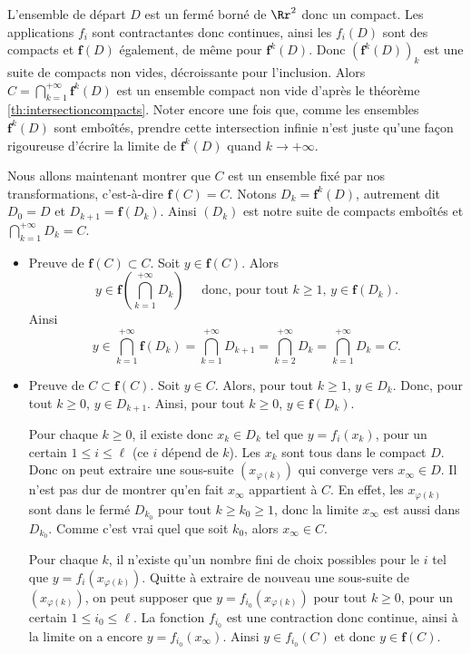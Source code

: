 \documentclass[11pt,class=report,crop=false]{standalone}
\begin{document}
\medskip

L'ensemble de départ $D$ est un fermé borné de $\Rr^2$ donc un compact.
Les applications $f_i$ sont contractantes donc continues, ainsi
les $f_i(D)$ sont des compacts et $\mathbf{f}(D)$ également, de même pour $\mathbf{f}^k(D)$.
Donc  $\left(\mathbf{f}^k(D)\right)_k$ est une suite de compacts non vides,
décroissante pour l'inclusion. Alors $C = \bigcap_{k=1}^{+\infty} \mathbf{f}^k(D)$
est un ensemble compact non vide d'après le théorème \ref{th:intersectioncompacts}. 
Noter encore une fois que, comme les ensembles $\mathbf{f}^k(D)$ sont emboîtés, 
prendre cette intersection infinie n'est juste qu'une façon rigoureuse d'écrire
la limite de $\mathbf{f}^k(D)$ quand $k\to +\infty$. 

Nous allons maintenant montrer que $C$ est un ensemble fixé par nos transformations, c'est-à-dire
$\mathbf{f}(C)=C$.
Notons $D_k = \mathbf{f}^k(D)$, autrement dit $D_0 = D$ et $D_{k+1} = \mathbf{f}(D_k)$. Ainsi
$(D_k)$ est notre suite de compacts emboîtés et $\bigcap_{k=1}^{+\infty} D_k = C$.


\begin{itemize}
  \item Preuve de $\mathbf{f}(C) \subset C$.  
  Soit $y \in \mathbf{f}(C)$. Alors 
  $$y \in \mathbf{f}\left(\bigcap_{k=1}^{+\infty} D_k\right)
  \quad \text{ donc, pour tout $k\ge 1$, } y \in \mathbf{f}(D_k).$$
   Ainsi
  $$y \in \bigcap_{k=1}^{+\infty}\mathbf{f}(D_k) 
  = \bigcap_{k=1}^{+\infty} D_{k+1} = \bigcap_{k=2}^{+\infty} D_{k}
  = \bigcap_{k=1}^{+\infty} D_{k} = C.$$
  
  \item Preuve de $C \subset \mathbf{f}(C)$.
  Soit $y \in C$. Alors, pour tout $k\ge1$, $y \in D_k$.
  Donc, pour tout $k\ge0$, $y \in D_{k+1}$. Ainsi, 
  pour tout $k\ge0$, $y \in \mathbf{f}({D_k})$.
  
  Pour chaque $k\ge0$, il existe donc $x_k \in D_k$ tel que 
  $y = f_i(x_k)$, pour un certain $1 \le i \le \ell$ (ce $i$ dépend de $k$).
  Les $x_k$ sont tous dans le compact $D$. Donc on peut extraire une sous-suite $(x_{\varphi(k)})$ 
  qui converge vers $x_\infty \in D$. 
  Il n'est pas dur de montrer qu'en fait $x_\infty$ appartient à $C$. En effet,
  les $x_{\varphi(k)}$ sont dans le fermé $D_{k_0}$ pour tout $k\ge k_0 \ge 1$, donc la limite 
  $x_\infty$ est aussi dans $D_{k_0}$. Comme c'est vrai quel que soit $k_0$, alors $x_\infty \in C$.
  
  Pour chaque $k$, il n'existe qu'un nombre fini de choix possibles pour le $i$
  tel que $y = f_i(x_{\varphi(k)})$. Quitte à extraire de nouveau une sous-suite de $(x_{\varphi(k)})$,
  on peut supposer que $y = f_{i_0}(x_{\varphi(k)})$
  pour tout $k\ge0$, pour un certain $1 \le i_0 \le \ell$. La fonction $f_{i_0}$ est une contraction donc continue, ainsi à la limite on a encore
  $y = f_{i_0}(x_\infty)$. Ainsi $y \in f_{i_0}(C)$ et donc $y \in \mathbf{f}(C)$.
   
\end{itemize}
\end{document}
